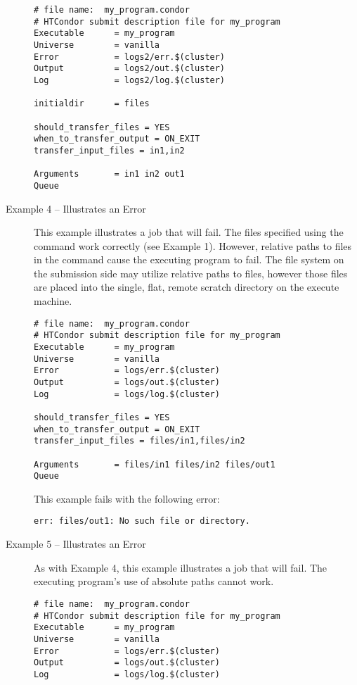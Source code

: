 \begin{description}
\footnotesize
\begin{verbatim}
# file name:  my_program.condor
# HTCondor submit description file for my_program
Executable      = my_program
Universe        = vanilla
Error           = logs2/err.$(cluster)
Output          = logs2/out.$(cluster)
Log             = logs2/log.$(cluster)

initialdir      = files

should_transfer_files = YES
when_to_transfer_output = ON_EXIT
transfer_input_files = in1,in2

Arguments       = in1 in2 out1
Queue
\end{verbatim}
\normalsize

\item[Example 4 -- Illustrates an Error]

This example illustrates a job that will fail.
The files specified using the
 command work
correctly (see Example 1).
However,
relative paths to files in the
 command
cause the executing program to fail.
The file system on the submission side may utilize
relative paths to files,
however those files are placed into the single,
flat, remote scratch directory on the execute machine.

\footnotesize
\begin{verbatim}
# file name:  my_program.condor
# HTCondor submit description file for my_program
Executable      = my_program
Universe        = vanilla
Error           = logs/err.$(cluster)
Output          = logs/out.$(cluster)
Log             = logs/log.$(cluster)

should_transfer_files = YES
when_to_transfer_output = ON_EXIT
transfer_input_files = files/in1,files/in2

Arguments       = files/in1 files/in2 files/out1
Queue
\end{verbatim}
\normalsize

This example fails with the following error:
\footnotesize
\begin{verbatim}
err: files/out1: No such file or directory.
\end{verbatim}
\normalsize

\item[Example 5 -- Illustrates an Error]

As with Example 4,
this example illustrates a job that will fail.
The executing program's use of 
absolute paths cannot work.

\footnotesize
\begin{verbatim}
# file name:  my_program.condor
# HTCondor submit description file for my_program
Executable      = my_program
Universe        = vanilla
Error           = logs/err.$(cluster)
Output          = logs/out.$(cluster)
Log             = logs/log.$(cluster)


\end{verbatim}
\end{description}
